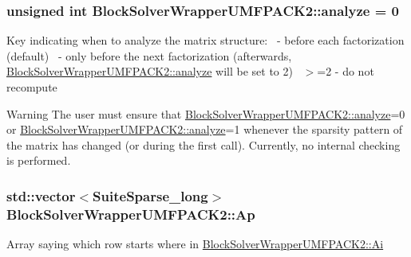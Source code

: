 \subsubsection[{\texorpdfstring{analyze}{analyze}}]{\setlength{\rightskip}{0pt plus 5cm}unsigned int Block\+Solver\+Wrapper\+U\+M\+F\+P\+A\+C\+K2\+::analyze = 0}\hypertarget{class_block_solver_wrapper_u_m_f_p_a_c_k2_a5869a4301c4e7a3ae64aa8998131d8c7}{}\label{class_block_solver_wrapper_u_m_f_p_a_c_k2_a5869a4301c4e7a3ae64aa8998131d8c7}
Key indicating when to analyze the matrix structure\+:~ -\/ before each factorization (default)~ -\/ only before the next factorization (afterwards, \hyperlink{class_block_solver_wrapper_u_m_f_p_a_c_k2_a5869a4301c4e7a3ae64aa8998131d8c7}{Block\+Solver\+Wrapper\+U\+M\+F\+P\+A\+C\+K2\+::analyze} will be set to 2)~\newline
 $>$=2 -\/ do not recompute

\begin{DoxyWarning}{Warning}
The user must ensure that \hyperlink{class_block_solver_wrapper_u_m_f_p_a_c_k2_a5869a4301c4e7a3ae64aa8998131d8c7}{Block\+Solver\+Wrapper\+U\+M\+F\+P\+A\+C\+K2\+::analyze}=0 or \hyperlink{class_block_solver_wrapper_u_m_f_p_a_c_k2_a5869a4301c4e7a3ae64aa8998131d8c7}{Block\+Solver\+Wrapper\+U\+M\+F\+P\+A\+C\+K2\+::analyze}=1 whenever the sparsity pattern of the matrix has changed (or during the first call). Currently, no internal checking is performed. 
\end{DoxyWarning}
\subsubsection[{\texorpdfstring{Ap}{Ap}}]{\setlength{\rightskip}{0pt plus 5cm}std\+::vector$<$Suite\+Sparse\+\_\+long$>$ Block\+Solver\+Wrapper\+U\+M\+F\+P\+A\+C\+K2\+::\+Ap\hspace{0.3cm}{\ttfamily [private]}}\hypertarget{class_block_solver_wrapper_u_m_f_p_a_c_k2_a18e53f152f97e51caab8dcf3efd5eaf1}{}\label{class_block_solver_wrapper_u_m_f_p_a_c_k2_a18e53f152f97e51caab8dcf3efd5eaf1}
Array saying which row starts where in \hyperlink{class_block_solver_wrapper_u_m_f_p_a_c_k2_a088fc386567b26c63b8d1a25a9319c75}{Block\+Solver\+Wrapper\+U\+M\+F\+P\+A\+C\+K2\+::\+Ai} 
